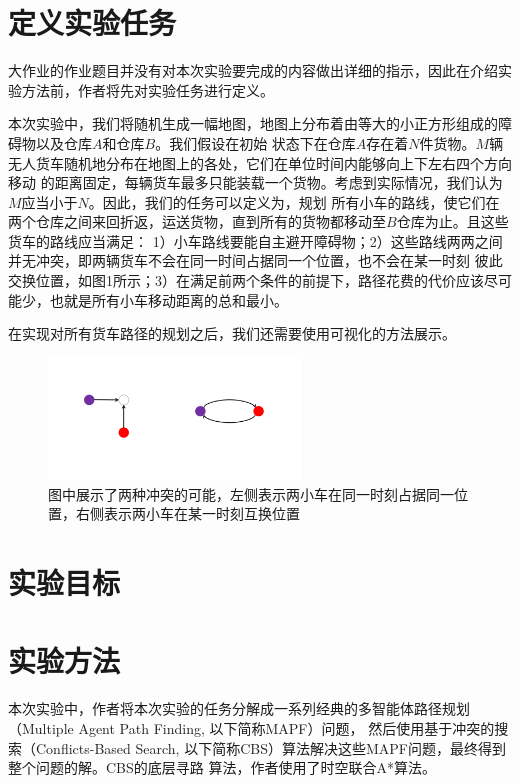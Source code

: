 \documentclass[UTF8]{ctexart}  %
\begin{document}
\section{定义实验任务}
大作业的作业题目并没有对本次实验要完成的内容做出详细的指示，因此在介绍实验方法前，作者将先对实验任务进行定义。

本次实验中，我们将随机生成一幅地图，地图上分布着由等大的小正方形组成的障碍物以及仓库$A$和仓库$B$。我们假设在初始
状态下在仓库$A$存在着$N$件货物。$M$辆无人货车随机地分布在地图上的各处，它们在单位时间内能够向上下左右四个方向移动
的距离固定，每辆货车最多只能装载一个货物。考虑到实际情况，我们认为$M$应当小于$N$。因此，我们的任务可以定义为，规划
所有小车的路线，使它们在两个仓库之间来回折返，运送货物，直到所有的货物都移动至$B$仓库为止。且这些货车的路线应当满足：
1）小车路线要能自主避开障碍物；2）这些路线两两之间并无冲突，即两辆货车不会在同一时间占据同一个位置，也不会在某一时刻
彼此交换位置，如图1所示；3）在满足前两个条件的前提下，路径花费的代价应该尽可能少，也就是所有小车移动距离的总和最小。

在实现对所有货车路径的规划之后，我们还需要使用可视化的方法展示。


\begin{figure}[H]
    \centering
    \centering
    \includegraphics[width=0.6\textwidth, keepaspectratio]{fig1.png}
    \captionsetup{font=footnotesize}
    \caption{图中展示了两种冲突的可能，左侧表示两小车在同一时刻占据同一位置，右侧表示两小车在某一时刻互换位置}
    \label{figure1}
\end{figure}



\section{实验目标}
\section{实验方法}
本次实验中，作者将本次实验的任务分解成一系列经典的多智能体路径规划（Multiple Agent Path Finding, 以下简称MAPF）问题，
然后使用基于冲突的搜索（Conflicts-Based Search, 以下简称CBS）算法解决这些MAPF问题，最终得到整个问题的解。CBS的底层寻路
算法，作者使用了时空联合A*算法。
\end{document}
